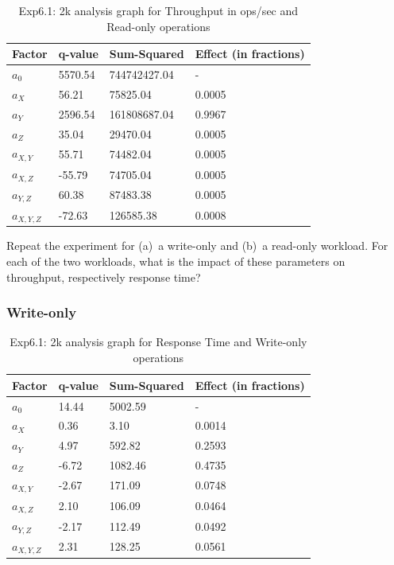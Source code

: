 \documentclass[11pt,a4paper]{article}
\begin{document}
\begin{center}
	\begin{table}[H]
	\center
    \begin{tabular}{ | l | l | l | l |  }
    \hline
    Factor & q-value & Sum-Squared & Effect (in fractions) \\ \hline
    $a_0$ & 5570.54 & 744742427.04 & - \\ \hline
    $a_X$ & 56.21 & 75825.04 & 0.0005	 \\ \hline
    $a_Y$ & 2596.54 & 161808687.04 & 0.9967 \\ \hline
    $a_Z$ & 35.04  & 29470.04	 & 0.0005 \\ \hline
   	$a_{X, Y}$ & 55.71 & 74482.04	 & 0.0005 \\ \hline
    $a_{X, Z}$ & -55.79 & 74705.04 & 0.0005 \\ \hline
    $a_{Y, Z}$ & 60.38 & 87483.38 & 0.0005 \\ \hline
    $a_{X, Y, Z}$ & -72.63 & 126585.38 & 0.0008 \\
    \hline
    \end{tabular}
  	\caption{Exp6.1: 2k analysis graph for Throughput in ops/sec and Read-only operations}	 
  	\end{table}  
\end{center}




Repeat the experiment for (a)~a write-only and (b)~a read-only workload.
For each of the two workloads, what is the impact of these parameters on throughput, respectively response time?




\subsubsection{Write-only}

\begin{center}
	\begin{table}[H]
	\center
    \begin{tabular}{ | l | l | l | l |  }
    \hline
    Factor & q-value & Sum-Squared & Effect (in fractions) \\ \hline
    $a_0$ & 14.44 & 5002.59 & - \\ \hline
    $a_X$ & 0.36 & 3.10 & 0.0014 \\ \hline
    $a_Y$ & 4.97 & 592.82 & 0.2593 \\ \hline
    $a_Z$ & -6.72  & 1082.46 & 0.4735 \\ \hline
   	$a_{X, Y}$ & -2.67 & 171.09 & 0.0748	 \\ \hline
    $a_{X, Z}$ & 2.10 & 106.09	 & 0.0464	 \\ \hline
    $a_{Y, Z}$ & -2.17 & 112.49 & 0.0492	 \\ \hline
    $a_{X, Y, Z}$ & 2.31 & 128.25 & 0.0561 \\
    \hline
    \end{tabular}
  	\caption{Exp6.1: 2k analysis graph for Response Time and Write-only operations}	 
  	\end{table}  
\end{center}
\end{document}

